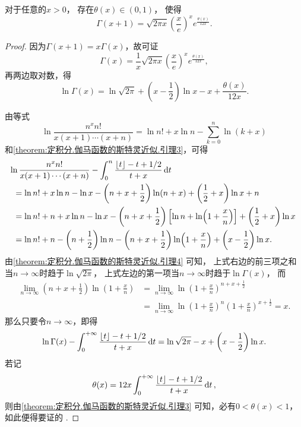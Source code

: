 \begin{theorem}
对于任意的\(x>0\)，
存在\(\theta(x)\in(0,1)\)，
使得\begin{equation}\label{equation:定积分.伽马函数的斯特林近似}
	\Gamma(x+1) = \sqrt{2\pi x}
		\left(\frac{x}{e}\right)^x e^{\frac{\theta(x)}{12x}}.
\end{equation}
\begin{proof}
因为\(\Gamma(x+1) = x \Gamma(x)\)，故可证\[
\Gamma(x) = \frac{1}{x} \sqrt{2\pi x} \left(\frac{x}{e}\right)^x e^{\frac{\theta(x)}{12x}},
\]再两边取对数，得\[
\ln \Gamma(x) = \ln\sqrt{2\pi} + \left(x - \frac{1}{2}\right) \ln x - x + \frac{\theta(x)}{12x}.
\]

由等式\[
\ln\frac{n^x n!}{x(x+1)\dotsm(x+n)}
= \ln n! + x \ln n - \sum_{k=0}^n \ln(k+x)
\]和\cref{theorem:定积分.伽马函数的斯特灵近似.引理3}，可得\begin{align*}
&\hspace{-5pt}
\ln\frac{n^x n!}{x(x+1)\dotsm(x+n)}
- \int_0^n \frac{\lfloor t\rfloor - t + 1/2}{t + x} \dd{t} \\
&= \ln n! + x \ln n - \ln x - \left(n+x+\frac{1}{2}\right) \ln(n+x) + \left(\frac{1}{2}+x\right) \ln x + n \\
&= \ln n! + n + x \ln n - \ln x
- \left(n+x+\frac{1}{2}\right) \left[\ln n + \ln(1+\frac{x}{n})\right]
+ \left(\frac{1}{2}+x\right) \ln x \\
&= \ln n! + n - \left(n+\frac{1}{2}\right) \ln n
- \left(n+x+\frac{1}{2}\right) \ln(1+\frac{x}{n})
+ \left(x-\frac{1}{2}\right) \ln x.
\end{align*}
由\cref{theorem:定积分.伽马函数的斯特灵近似.引理4} 可知，
上式右边的前三项之和当\(n\to\infty\)时趋于\(\ln\sqrt{2\pi}\)，
上式左边的第一项当\(n\to\infty\)时趋于\(\ln\Gamma(x)\)，
而{%
\def\l{\lim_{n\to\infty}}%
\def\xn{\left(1+\frac{x}{n}\right)}%
\begin{align*}
\l \left(n+x+\frac{1}{2}\right) \ln\xn
&= \l \ln\xn^{n+x+\frac{1}{2}} \\
&= \l \ln\xn^n \xn^{x+\frac{1}{2}}
= x.
\end{align*}}
那么只要令\(n\to\infty\)，即得\[
\ln\Gamma(x) - \int_0^{+\infty} \frac{\lfloor t\rfloor - t + 1/2}{t + x} \dd{t}
= \ln\sqrt{2\pi} - x + \left(x - \frac{1}{2}\right) \ln x.
\]若记\[
\theta(x) = 12 x \int_0^{+\infty} \frac{\lfloor t\rfloor - t + 1/2}{t + x} \dd{t},
\]则由\cref{theorem:定积分.伽马函数的斯特灵近似.引理3} 可知，必有\(0<\theta(x)<1\)，如此便得要证的 .
\end{proof}
\end{theorem}

